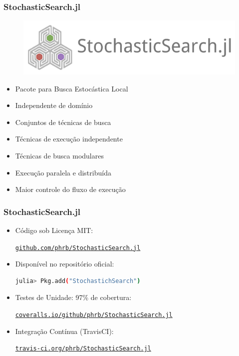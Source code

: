 \documentclass[10pt, compress]{beamer}
\begin{document}
\begin{frame}[fragile]
    \frametitle{StochasticSearch.jl}
    \begin{figure}[H]
        \centering
        \includegraphics[width=.7\textwidth]{stochasticsearchlogo}
    \end{figure}%
    \begin{itemize}
        \item Pacote para \alert{Busca Estocástica Local}
        \item \alert{Independente} de domínio
        \item \alert{Conjuntos} de técnicas de busca
            \pause
        \item Técnicas de execução \alert{independente}
        \item Técnicas de busca \alert{modulares}
            \pause
        \item Execução \alert{paralela} e \alert{distribuída}
            \pause
        \item Maior \alert{controle} do fluxo de execução
    \end{itemize}
\end{frame}

\begin{frame}[fragile]
    \frametitle{StochasticSearch.jl}
    \begin{itemize}
        \item Código sob Licença MIT:

            \href{http://github.com/phrb/StochasticSearch.jl}{\tt github.com/phrb/StochasticSearch.jl}
        \item Disponível no \alert{repositório oficial}:
            \begin{lstlisting}[language=bash]
julia> Pkg.add("StochastichSearch")
            \end{lstlisting}
            \pause
        \item Testes de Unidade: \alert{97\%} de cobertura:

                \href{https://coveralls.io/github/phrb/StochasticSearch.jl}{\tt coveralls.io/github/phrb/StochasticSearch.jl}
        \item Integração Contínua (\alert{TravisCI}):

            \href{https://travis-ci.org/phrb/StochasticSearch.jl}{\tt travis-ci.org/phrb/StochasticSearch.jl}
    \end{itemize}
\end{frame}
\end{document}
